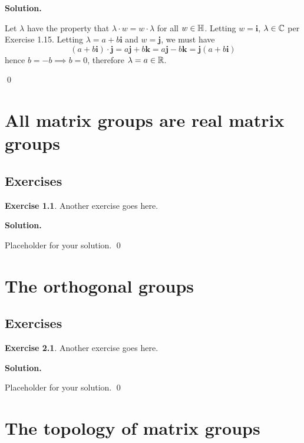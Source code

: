 \documentclass[12pt]{book}
\theoremstyle{definition}
\newtheorem{exercise}{Exercise}[chapter]
\newenvironment{solution}
{%
  \par\noindent\textbf{Solution.}\quad
}
{%
  \qed\par
}
\begin{document}
\begin{solution}
  Let $\lambda$ have the property that $\lambda \cdot w = w \cdot \lambda$ for all $w \in \mathbb{H}$.
  Letting $w = \mathbf{i}$, $\lambda \in \mathbb{C}$ per Exercise 1.15.
  Letting $\lambda = a+b\mathbf{i}$ and $w = \mathbf{j}$, we must have
  \[
    (a+b\mathbf{i}) \cdot \mathbf{j} = a\mathbf{j} + b\mathbf{k} = a\mathbf{j} - b\mathbf{k} = \mathbf{j}(a+b \mathbf{i})
  \]
  hence $b = -b \implies b = 0$, therefore $\lambda = a \in \mathbb{R}$.
  
\end{solution}

\chapter{All matrix groups are real matrix groups}
\section{Exercises}

\begin{exercise}
Another exercise goes here.
\end{exercise}

\begin{solution}
Placeholder for your solution.
\end{solution}

\chapter{The orthogonal groups}
\section{Exercises}

\begin{exercise}
Another exercise goes here.
\end{exercise}

\begin{solution}
Placeholder for your solution.
\end{solution}

\chapter{The topology of matrix groups}
\end{document}
